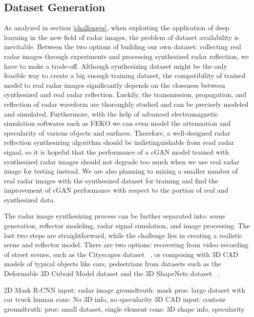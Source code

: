 \subsection{Dataset Generation}
As analyzed in section \ref{challenges}, when exploiting the application of deep learning in the new field of radar images, the problem of dataset availability is inevitable. Between the two options of building our own dataset: collecting real radar images through experiments and processing synthesized radar reflection, we have to make a trade-off. Although synthesizing dataset might be the only feasible way to create a big enough training dataset, the compatibility of trained model to real radar images significantly depends on the closeness between synthesized  and real radar reflection. Luckily, the transmission, propagation, and reflection of radar waveform are thoroughly studied and can be precisely modeled and simulated. Furthermore, with the help of advanced electromagnetic simulation softwares such as FEKO we can even model the attenuation and specularity of various objects and surfaces. Therefore, a well-designed radar reflection synthesizing algorithm should be indistinguishable from read radar signal, so it is hopeful that the performance of a cGAN model trained with synthesized radar images should not degrade too much when we use real radar image for testing instead. We are also planning to mixing a smaller number of real radar images with the synthesized dataset for training and find the improvement of cGAN performance with respect to the portion of real and synthesized data.  

The radar image synthesizing process can be further separated into: scene generation, reflector modeling, radar signal simulation, and image processing. The last two steps are straightforward, while the challenge lies in creating a realistic scene and reflector model. There are two options: recovering from video recording of street scenes, such as the Cityscapes dataset ~\cite{cityscapes}, or composing with 3D CAD models of typical objects like cars, pedestrians from datasets such as the Deformable 3D Cuboid Model dataset and the 3D ShapeNets dataset ~\cite{3Ddata, shapenets}.

2D
	Mask R-CNN
		input: radar image
		groundtruth: mask
	pros: large dataset with car truck human 
	cons: No 3D info, no specularity
	3D CAD
		input: contour
		groundtruth:
	pros: small dataset, single element 
	cons: 3D shape info, specularity 

